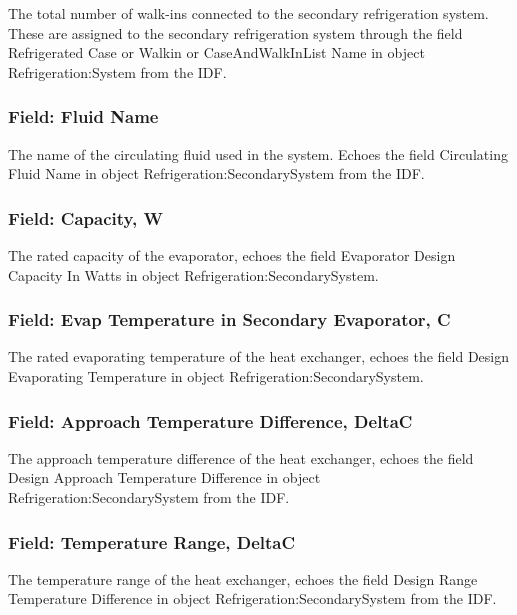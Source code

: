 The total number of walk-ins connected to the secondary refrigeration system. These are assigned to the secondary refrigeration system through the field Refrigerated Case or Walkin or CaseAndWalkInList Name in object Refrigeration:System from the IDF.

\subsubsection{Field: Fluid Name}\label{field-fluid-name}

The name of the circulating fluid used in the system. Echoes the field Circulating Fluid Name in object Refrigeration:SecondarySystem from the IDF.

\subsubsection{Field: Capacity, W}\label{field-capacity-w}

The rated capacity of the evaporator, echoes the field Evaporator Design Capacity In Watts in object Refrigeration:SecondarySystem.

\subsubsection{Field: Evap Temperature in Secondary Evaporator, C}\label{field-evap-temperature-in-secondary-evaporator-c}

The rated evaporating temperature of the heat exchanger, echoes the field Design Evaporating Temperature in object Refrigeration:SecondarySystem.

\subsubsection{Field: Approach Temperature Difference, DeltaC}\label{field-approach-temperature-difference-deltac-1}

The approach temperature difference of the heat exchanger, echoes the field Design Approach Temperature Difference in object Refrigeration:SecondarySystem from the IDF.

\subsubsection{Field: Temperature Range, DeltaC}\label{field-temperature-range-deltac}

The temperature range of the heat exchanger, echoes the field Design Range Temperature Difference in object Refrigeration:SecondarySystem from the IDF.

